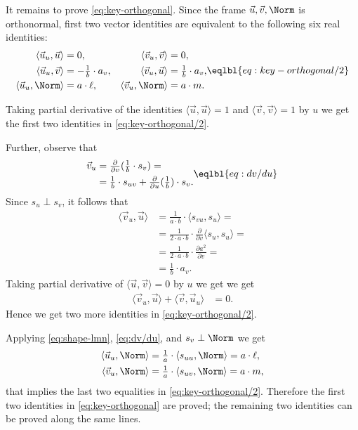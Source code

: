 It remains to prove \ref{eq:key-orthogonal}.
Since the frame $\vec u, \vec v,\Norm$ is orthonormal,
first two vector identities are equivalent to the following six real identities:
\[
\begin{aligned}
\langle\vec u_u,\vec u\rangle
&=0,
&
\langle\vec v_u,\vec v\rangle
&=0,
\\
\langle\vec u_u,\vec v\rangle
&=-\tfrac1{b}\cdot a_v,
&
\langle\vec v_u,\vec u\rangle
&=
\tfrac1{b}\cdot a_v,
\\
\langle\vec u_u,\Norm\rangle
&=a\cdot \ell,
&
\langle\vec v_u,\Norm\rangle
&=
a\cdot m.
\end{aligned}
\eqlbl{eq:key-orthogonal/2}
\]

Taking partial derivative of the identities
$\langle\vec u,\vec u\rangle=1$ and
$\langle\vec v,\vec v\rangle=1$ by $u$
we get the first two identities in \ref{eq:key-orthogonal/2}.

Further, observe that
\[
\begin{aligned}
\vec v_u
&=
\tfrac{\partial}{\partial v}
(\tfrac1b\cdot  s_v)=
\\
&=\tfrac1b\cdot s_{uv}
+
\tfrac{\partial}{\partial u}(\tfrac1b)
\cdot
 s_v.
\end{aligned}
\eqlbl{eq:dv/du}
\]
Since $s_u\perp s_v$, it follows that
\begin{align*}
\langle\vec v_u,\vec u\rangle
&=
\tfrac1{a\cdot b}\cdot \langle s_{vu}, s_u\rangle
=
\\
&=\tfrac1{2\cdot a\cdot b}\cdot \tfrac{\partial}{\partial v}\langle s_u, s_u\rangle=
\\
&=\tfrac1{2\cdot a\cdot b}\cdot \tfrac{\partial a^2}{\partial v}=
\\
&=\tfrac1{b}\cdot a_v.
\end{align*}
Taking partial derivative of
$\langle\vec u,\vec v\rangle=0$  by $u$
we get
we get
\begin{align*}
\langle\vec v_u,\vec u\rangle+
\langle\vec v,\vec u_u\rangle
&=0.
\end{align*}
Hence we get two more identities in \ref{eq:key-orthogonal/2}.


Applying \ref{eq:shape-lmn}, \ref{eq:dv/du}, and $s_v\perp\Norm$ we get
\begin{align*}
\langle\vec u_u,\Norm\rangle
&=
\tfrac1{a}\cdot \langle s_{uu},\Norm\rangle
=a\cdot \ell,
\\
\langle\vec v_u,\Norm\rangle
&=
\tfrac1{a}\cdot \langle s_{uv},\Norm\rangle
=a\cdot m,
\end{align*}
that implies the last two equalities in \ref{eq:key-orthogonal/2}.
Therefore the first two identities in \ref{eq:key-orthogonal} are proved;
the remaining two identities can be proved along the same lines.
\qeds



























